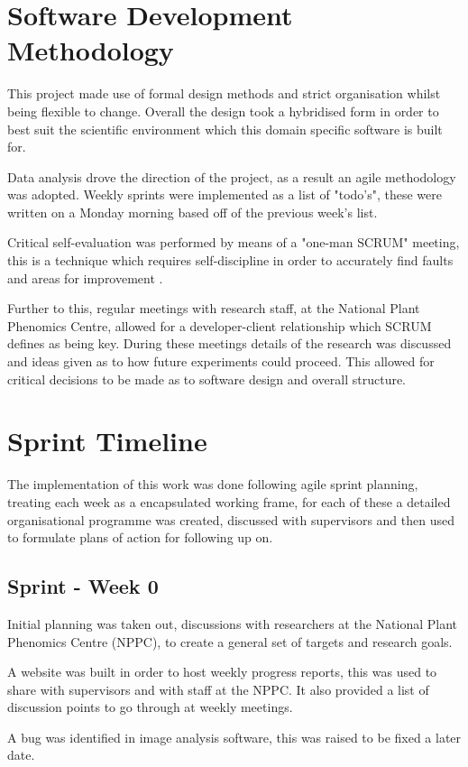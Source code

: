 \documentclass[11pt]{report}
\begin{document}
\section{Software Development Methodology}
\label{sec:org1539308}
This project made use of formal design methods and strict organisation whilst being flexible to change. Overall the design took a hybridised form in order to best suit the scientific environment which this domain specific software is built for.

Data analysis drove the direction of the project, as a result an agile methodology was adopted.
Weekly sprints were implemented as a list of "todo's", these were written on a Monday morning based off of the previous week's list.

Critical self-evaluation was performed by means of a "one-man SCRUM" meeting, this is a technique which requires self-discipline in order to accurately find faults and areas for improvement \cite{Andrews}.

Further to this, regular meetings with research staff, at the National Plant Phenomics Centre,  allowed for a developer-client relationship which SCRUM defines as being key. During these meetings details of the research was discussed and ideas given as to how future experiments could proceed. This allowed for critical decisions to be made as to software design and overall structure.
\section{Sprint Timeline}
\label{sec:org66193a8}
The implementation of this work was done following agile sprint planning, treating each week as a encapsulated working frame, for each of these a detailed organisational programme was created, discussed with supervisors and then used to formulate plans of action for following up on.
\subsection{Sprint - Week 0}
\label{sec:orgb66f28b}
Initial planning was taken out, discussions with researchers at the National Plant Phenomics Centre (NPPC), to create a general set of targets and research goals.

A website was built in order to host weekly progress reports, this was used to share with supervisors and with staff at the NPPC. It also provided a list of discussion points to go through at weekly meetings.

A bug was identified in image analysis software, this was raised to be fixed a later date.
\end{document}
